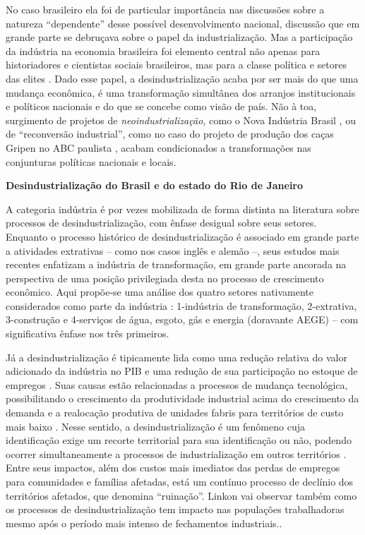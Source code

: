{No caso brasileiro ela foi de particular importância nas discussões
sobre a natureza ``dependente''
\citep{evans_dependent_2018} desse
possível desenvolvimento nacional, discussão que em grande parte se
debruçava sobre o papel da industrialização. Mas a participação da
indústria na economia brasileira foi elemento central não apenas para
historiadores e cientistas sociais brasileiros, mas para a classe
política e setores das elites
\citep{barbosa_developmentalist_2020}. Dado
esse papel, a desindustrialização acaba por ser mais do que uma mudança
econômica, é uma transformação simultânea dos arranjos institucionais e
políticos nacionais e do que se concebe como visão de país. Não à toa,
surgimento de projetos de \emph{neoindustrialização,} como o Nova
Indústria Brasil \citep{cndi_nova_2024}, ou de ``reconversão industrial'', como no caso do
projeto de produção dos caças Gripen no ABC paulista
\citep{ramalhoconceicao2024}, acabam condicionados a transformações nas conjunturas políticas
nacionais e locais.

\textbf{Desindustrialização do Brasil e do estado do Rio de Janeiro}

A categoria indústria é por vezes mobilizada de forma distinta na
literatura sobre processos de desindustrialização, com ênfase desigual
sobre seus setores. Enquanto o processo histórico de desindustrialização
é associado em grande parte a atividades extrativas -- como nos casos
inglês \citep{tomlinson_-industrialization_2016} e alemão
\citep{berger_burdens_2017} --, seus estudos mais recentes enfatizam a indústria de
transformação, em grande parte ancorada na perspectiva de uma posição
privilegiada desta no processo de crescimento econômico. Aqui propõe-se
uma análise dos quatro setores nativamente considerados como parte da
indústria \citep{cni_sd}: 1-indústria de transformação, 2-extrativa, 3-construção e
4-serviços de água, esgoto, gás e energia (doravante AEGE) -- com
significativa ênfase nos três primeiros.

Já a desindustrialização é tipicamente lida como uma redução relativa do
valor adicionado da indústria no PIB e uma redução de sua participação
no estoque de empregos
\citep{tregenna_characterising_2009}.
Suas causas estão relacionadas a processos de mudança tecnológica,
possibilitando o crescimento da produtividade industrial acima do
crescimento da demanda
\citep{rowthorn_growth_1999} e a realocação produtiva de unidades fabris para territórios de
custo mais baixo
\citep{alderson_explaining_1999}.
Nesse sentido, a desindustrialização é um fenômeno cuja identificação
exige um recorte territorial para sua identificação ou não, podendo
ocorrer simultaneamente a processos de industrialização em outros
territórios \citep{bluestone_deindustrialization_1982}. Entre seus impactos, além dos custos mais imediatos
das perdas de empregos para comunidades e famílias afetadas, está um
contínuo processo de declínio dos territórios afetados, que
\citep{mah_industrial_2012} denomina
``ruinação''. Linkon
\citet{linkon_half-life_2018} vai observar
também como os processos de desindustrialização tem impacto nas
populações trabalhadoras mesmo após o período mais intenso de
fechamentos industriais..

}
